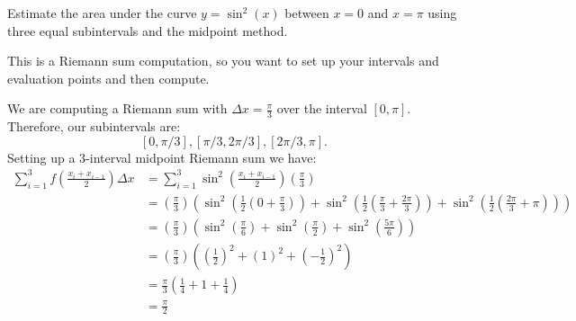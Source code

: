 \documentclass{ximera}
\author{Emma Smith Zbarsky}
\begin{document}
\begin{exercise}

Estimate the area under the curve $y=\sin^2(x)$ between $x=0$ and
$x=\pi$ using three equal subintervals and the midpoint method.


\begin{hint}
This is a Riemann sum computation, so you want to set up your intervals
and evaluation points and then compute.
\end{hint}


\begin{hint}
We are computing a Riemann sum with $\Delta x = \frac{\pi}{3}$ over the
interval $[0,\pi]$. Therefore, our subintervals are:
\[[0,\pi/3], [\pi/3,2\pi/3], [2\pi/3,\pi].\] Setting up a 3-interval
midpoint Riemann sum we have: \begin{align*}
\sum_{i=1}^3 f\left(\frac{x_i+x_{i-1}}{2}\right) \Delta x &= \sum_{i=1}^3 \sin^2\left(\frac{x_i+x_{i-1}}{2}\right) \left(\frac{\pi}{3}\right) \\
&= \left(\frac{\pi}{3}\right)\left(\sin^2\left(\frac{1}{2}\left(0+\frac{\pi}{3}\right)\right)+\sin^2\left(\frac{1}{2}\left(\frac{\pi}{3}+\frac{2\pi}{3}\right)\right) + \sin^2\left(\frac{1}{2}\left(\frac{2\pi}{3}+\pi\right)\right)\right) \\
&= \left(\frac{\pi}{3}\right)\left(\sin^2\left(\frac{\pi}{6}\right)+\sin^2\left(\frac{\pi}{2}\right) + \sin^2\left(\frac{5\pi}{6}\right)\right) \\
&= \left(\frac{\pi}{3}\right)\left(\left(\frac{1}{2}\right)^2 + \left(1\right)^2 + \left(-\frac{1}{2}\right)^2\right) \\
&= \frac{\pi}{3}\left(\frac{1}{4}+1+\frac{1}{4}\right) \\
&= \boxed{\frac{\pi}{2}}
\end{align*}
\end{hint}


\begin{multipleChoice}
\end{multipleChoice}

\end{exercise}
\end{document}
